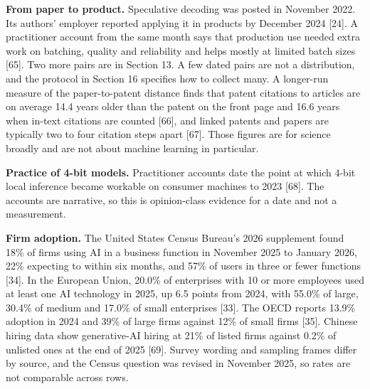 \documentclass[10pt,letterpaper]{article}
\begin{document}
\textbf{From paper to product.} Speculative decoding was posted in
November 2022. Its authors' employer reported applying it in products by
December 2024 {[}24{]}. A practitioner account from the same month says
that production use needed extra work on batching, quality and
reliability and helps mostly at limited batch sizes {[}65{]}. Two more
pairs are in Section 13. A few dated pairs are not a distribution, and
the protocol in Section 16 specifies how to collect many. A longer-run
measure of the paper-to-patent distance finds that patent citations to
articles are on average 14.4 years older than the patent on the front
page and 16.6 years when in-text citations are counted {[}66{]}, and
linked patents and papers are typically two to four citation steps apart
{[}67{]}. Those figures are for science broadly and are not about
machine learning in particular.

\textbf{Practice of 4-bit models.} Practitioner accounts date the point
at which 4-bit local inference became workable on consumer machines to
2023 {[}68{]}. The accounts are narrative, so this is opinion-class
evidence for a date and not a measurement.

\textbf{Firm adoption.} The United States Census Bureau's 2026
supplement found 18\% of firms using AI in a business function in
November 2025 to January 2026, 22\% expecting to within six months, and
57\% of users in three or fewer functions {[}34{]}. In the European
Union, 20.0\% of enterprises with 10 or more employees used at least one
AI technology in 2025, up 6.5 points from 2024, with 55.0\% of large,
30.4\% of medium and 17.0\% of small enterprises {[}33{]}. The OECD
reports 13.9\% adoption in 2024 and 39\% of large firms against 12\% of
small firms {[}35{]}. Chinese hiring data show generative-AI hiring at
21\% of listed firms against 0.2\% of unlisted ones at the end of 2025
{[}69{]}. Survey wording and sampling frames differ by source, and the
Census question was revised in November 2025, so rates are not
comparable across rows.
\end{document}
